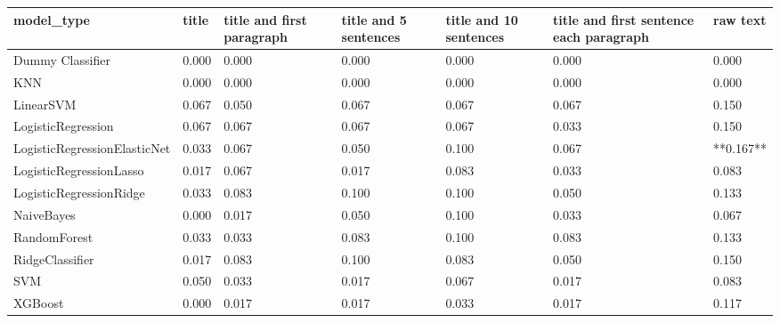 \begin{tabular}{lllllll}
\toprule
                  model\_type & title & title and first paragraph & title and 5 sentences & title and 10 sentences & title and first sentence each paragraph &  raw text \\
\midrule
            Dummy Classifier & 0.000 &                     0.000 &                 0.000 &                  0.000 &                                   0.000 &     0.000 \\
                         KNN & 0.000 &                     0.000 &                 0.000 &                  0.000 &                                   0.000 &     0.000 \\
                   LinearSVM & 0.067 &                     0.050 &                 0.067 &                  0.067 &                                   0.067 &     0.150 \\
          LogisticRegression & 0.067 &                     0.067 &                 0.067 &                  0.067 &                                   0.033 &     0.150 \\
LogisticRegressionElasticNet & 0.033 &                     0.067 &                 0.050 &                  0.100 &                                   0.067 & **0.167** \\
     LogisticRegressionLasso & 0.017 &                     0.067 &                 0.017 &                  0.083 &                                   0.033 &     0.083 \\
     LogisticRegressionRidge & 0.033 &                     0.083 &                 0.100 &                  0.100 &                                   0.050 &     0.133 \\
                  NaiveBayes & 0.000 &                     0.017 &                 0.050 &                  0.100 &                                   0.033 &     0.067 \\
                RandomForest & 0.033 &                     0.033 &                 0.083 &                  0.100 &                                   0.083 &     0.133 \\
             RidgeClassifier & 0.017 &                     0.083 &                 0.100 &                  0.083 &                                   0.050 &     0.150 \\
                         SVM & 0.050 &                     0.033 &                 0.017 &                  0.067 &                                   0.017 &     0.083 \\
                     XGBoost & 0.000 &                     0.017 &                 0.017 &                  0.033 &                                   0.017 &     0.117 \\
\bottomrule
\end{tabular}

